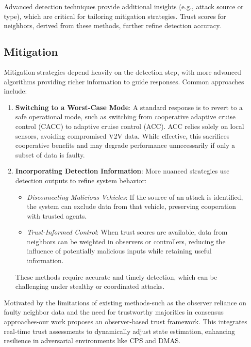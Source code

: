 \documentclass[letterpaper, 10pt, conference]{ieeeconf}  %
\begin{document}
Advanced detection techniques provide additional insights (e.g., attack source or type), which are critical for tailoring mitigation strategies. Trust scores for neighbors, derived from these methods, further refine detection accuracy.

\subsection*{Mitigation}
Mitigation strategies depend heavily on the detection step, with more advanced algorithms providing richer information to guide responses. Common approaches include:

\begin{enumerate}
    \item \textbf{Switching to a Worst-Case Mode}: 
    A standard response is to revert to a safe operational mode, such as switching from cooperative adaptive cruise control (CACC) to adaptive cruise control (ACC). ACC relies solely on local sensors, avoiding compromised V2V data. While effective, this sacrifices cooperative benefits and may degrade performance unnecessarily if only a subset of data is faulty.

    \item \textbf{Incorporating Detection Information}: 
    More nuanced strategies use detection outputs to refine system behavior:
    \begin{itemize}
        \item \textit{Disconnecting Malicious Vehicles}: If the source of an attack is identified, the system can exclude data from that vehicle, preserving cooperation with trusted agents.
        \item \textit{Trust-Informed Control}: When trust scores are available, data from neighbors can be weighted in observers or controllers, reducing the influence of potentially malicious inputs while retaining useful information.
    \end{itemize}
    These methods require accurate and timely detection, which can be challenging under stealthy or coordinated attacks.
\end{enumerate}

Motivated by the limitations of existing methods-such as the observer reliance on faulty neighbor data and the need for trustworthy majorities in consensus approaches-our work proposes an observer-based trust framework. This integrates real-time trust assessments to dynamically adjust state estimation, enhancing resilience in adversarial environments like CPS and DMAS.
\end{document}
